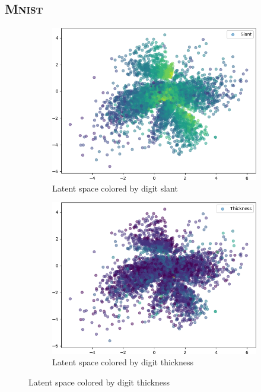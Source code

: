 \documentclass[11pt]{article}
\begin{document}
\subsection{\textsc{Mnist}}
\begin{figure}[H]
\centering
\begin{subfigure}{.32\textwidth}
\includegraphics[width=\textwidth]{images/latent_spaces/mnist/vae_gan/embeddings_mu_0.png}
\caption{Latent space colored by digit slant}
\label{subfig:vae_mnist_latent_space_slant}
\end{subfigure}
\hfill
\begin{subfigure}{.32\textwidth}
\includegraphics[width=\textwidth]{images/latent_spaces/mnist/vae_gan/embeddings_mu_1.png}
\caption{Latent space colored by digit thickness}

\end{subfigure}
\end{figure}
\end{document}
